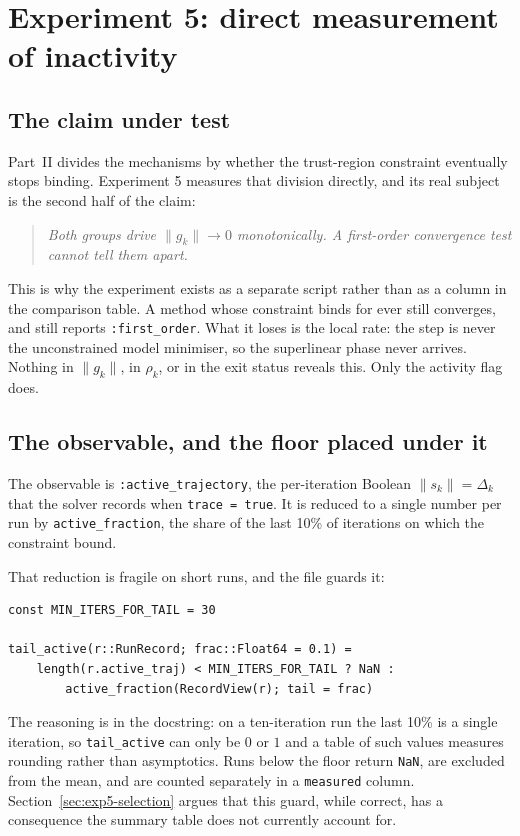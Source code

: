 \documentclass[11pt,a4paper]{article}
\newcommand{\jl}[1]{\texttt{\small #1}}
\newcommand{\gk}{\lVert g_k\rVert}
\begin{document}
\section{Experiment 5: direct measurement of inactivity}

\subsection{The claim under test}

Part~II divides the mechanisms by whether the trust-region constraint eventually
stops binding. Experiment 5 measures that division directly, and its real subject
is the second half of the claim:

\begin{quote}
\emph{Both groups drive $\gk \to 0$ monotonically. A first-order convergence test
cannot tell them apart.}
\end{quote}

This is why the experiment exists as a separate script rather than as a column in
the comparison table. A method whose constraint binds for ever still converges, and
still reports \jl{:first\_order}. What it loses is the local rate: the step is never
the unconstrained model minimiser, so the superlinear phase never arrives. Nothing
in $\gk$, in $\rho_k$, or in the exit status reveals this. Only the activity flag
does.

\subsection{The observable, and the floor placed under it}

The observable is \jl{:active\_trajectory}, the per-iteration Boolean
$\lVert s_k\rVert = \Delta_k$ that the solver records when \jl{trace = true}. It is
reduced to a single number per run by \jl{active\_fraction}, the share of the last
10\% of iterations on which the constraint bound.

That reduction is fragile on short runs, and the file guards it:

\begin{lstlisting}
const MIN_ITERS_FOR_TAIL = 30

tail_active(r::RunRecord; frac::Float64 = 0.1) =
    length(r.active_traj) < MIN_ITERS_FOR_TAIL ? NaN :
        active_fraction(RecordView(r); tail = frac)
\end{lstlisting}

The reasoning is in the docstring: on a ten-iteration run the last 10\% is a single
iteration, so \jl{tail\_active} can only be $0$ or $1$ and a table of such values
measures rounding rather than asymptotics. Runs below the floor return \jl{NaN},
are excluded from the mean, and are counted separately in a \jl{measured} column.
Section~\ref{sec:exp5-selection} argues that this guard, while correct, has a
consequence the summary table does not currently account for.
\end{document}
